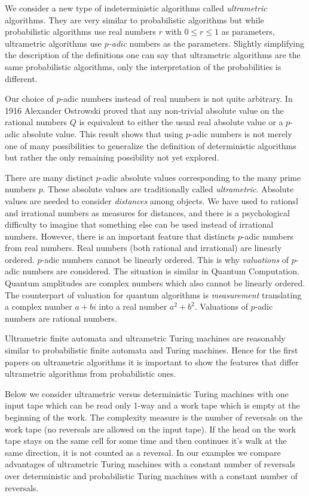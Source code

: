 \documentclass{llncs}
\begin{document}
We consider a new type of indeterministic algorithms called {\em ultrametric} algorithms. They are very similar to probabilistic algorithms but while probabilistic algorithms use real numbers $r$ with $0 \leq r \leq 1$ as parameters, ultrametric algorithms use {\em $p$-adic} numbers as the parameters.
Slightly simplifying the description of the definitions one can say that ultrametric algorithms are the same probabilistic algorithms, only the interpretation of the probabilities is different. 

Our choice of $p$-adic numbers instead of real numbers is not quite arbitrary. In 1916 Alexander Ostrowski 
proved that any non-trivial absolute value on the rational numbers $Q$ is equivalent to either the usual real absolute value or a $p$-adic absolute value.
This result shows that using $p$-adic numbers is not merely one of many possibilities to generalize the definition of deterministic algorithms but rather the only remaining possibility not yet explored.

There are many distinct $p$-adic absolute values corresponding to the many prime numbers $p$. These absolute values are traditionally  called {\em ultrametric}. 
Absolute values are needed to consider {\em distances} among objects. We have used to rationsl and irrational numbers as measures for distances, and there is a psychological difficulty to imagine that something else can be used instead of irrational numbers.
However, there is an important feature that distincts $p$-adic numbers from real numbers. Real numbers (both rational and irrational) are linearly ordered.
$p$-adic numbers cannot be linearly ordered. This is why {\em valuations} of $p$-adic numbers are considered. The situation is similar in Quantum Computation. Quantum amplitudes are complex numbers which also cannot be linearly ordered. The counterpart of valuation for quantum algorithms is {\em measurement} translating a complex number $a + bi$ into a real number $a^2 + b^2$. Valuations of $p$-adic numbers are rational numbers.

Ultrametric finite automata and ultrametric Turing machines are reasonably similar to probabilistic finite automata and Turing machines. Hence for the first papers on ultrametric algorithms it is important to show the features that differ ultrametric algorithms from probabilistic ones.


Below  we consider ultrametric versus deterministic Turing machines with one input tape which can be read only 1-way and a work tape which is empty at the beginning of the work.
The complexity measure is the number of reversals on the work tape (no reversals are allowed on the input tape). If the head on the work tape stays on the same cell for some time and then continues it's
walk at the same direction, it is not counted as a reversal. In our examples we compare advantages of ultrametric Turing machines with a constant number of reversals over deterministic and probabilistic Turing machines with a constant number of reversals.
\end{document}
